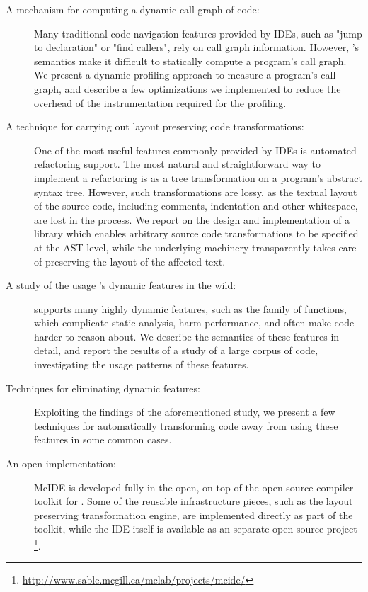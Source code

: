\begin{description}

\item[A mechanism for computing a dynamic call graph of \matlab code:] Many
traditional code navigation features provided by IDEs, such as "jump to
declaration" or "find callers", rely on call graph information. However,
\matlab's semantics make it difficult to statically compute a program's call
graph. We present a dynamic profiling approach to measure a \matlab program's
call graph, and describe a few optimizations we implemented to reduce the
overhead of the instrumentation required for the profiling.

\item[A technique for carrying out layout preserving code transformations:] One
of the most useful features commonly provided by IDEs is automated refactoring
support. The most natural and straightforward way to implement a refactoring is
as a tree transformation on a program's abstract syntax tree. However, such
transformations are lossy, as the textual layout of the source code, including
comments, indentation and other whitespace, are lost in the process. We report
on the design and implementation of a library which enables arbitrary source
code transformations to be specified at the AST level, while the underlying
machinery transparently takes care of preserving the layout of the affected
text.

\item[A study of the usage \matlab's dynamic features in the wild:] \matlab
supports many highly dynamic features, such as the  family of
functions, which complicate static analysis, harm performance, and often make
code harder to reason about. We describe the semantics of these features in
detail, and report the results of a study of a large corpus of \matlab code,
investigating the usage patterns of these features.

\item[Techniques for eliminating dynamic features:] Exploiting the findings of
the aforementioned study, we present a few techniques for automatically
transforming code away from using these features in some common cases.

\item[An open implementation:] McIDE is developed fully in the open, on top of
the open source \mclab compiler toolkit for \matlab. Some of the reusable
infrastructure pieces, such as the layout preserving transformation engine, are
implemented directly as part of the toolkit, while the IDE itself is available
as an separate open source project
\footnote{\url{http://www.sable.mcgill.ca/mclab/projects/mcide/}}.

\end{description}

